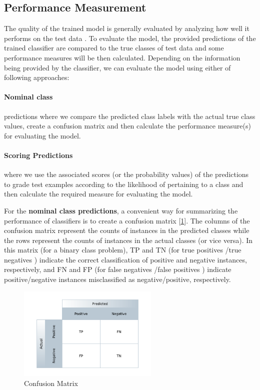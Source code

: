 \subsection{Performance Measurement}
The quality of the trained model is generally evaluated by analyzing how well it performs on the test data 
\cite{alsheikh-ali_public_2011}. To evaluate the model, the provided predictions of the trained classifier 
are compared to the true classes of test data and some performance measures will be then calculated. 
Depending on the information being provided by the classifier, we can evaluate the model using either of following approaches:

\paragraph{Nominal class} predictions where we compare the predicted class labels with the actual true class values, 
create a confusion matrix and then calculate the performance measure(s) for evaluating the model.

\paragraph{Scoring Predictions} where we use the associated scores (or the probability values) of the predictions 
to grade test examples according to the likelihood of pertaining to a class and then calculate the required 
measure for evaluating the model.

For the \textbf{nominal class predictions}, a convenient way for summarizing the performance of classifiers 
is to create a confusion matrix [\ref{fig:confusionMatrix}]. The columns of the confusion matrix represent the counts of instances in 
the predicted classes while the rows represent the counts of instances in the actual classes (or vice versa). 
In this matrix (for a binary class problem), TP and TN (for true positives /true negatives ) indicate the 
correct classification of positive and negative instances, respectively, and FN and FP 
(for false negatives /false positives ) indicate positive/negative instances misclassified as 
negative/positive, respectively. 

\begin{figure}[ht]
    \centering
    \includegraphics[width=0.60\textwidth]{figures/10ConfusionMatrix.png}
    \caption{Confusion Matrix}
    \label{fig:confusionMatrix}
\end{figure}

